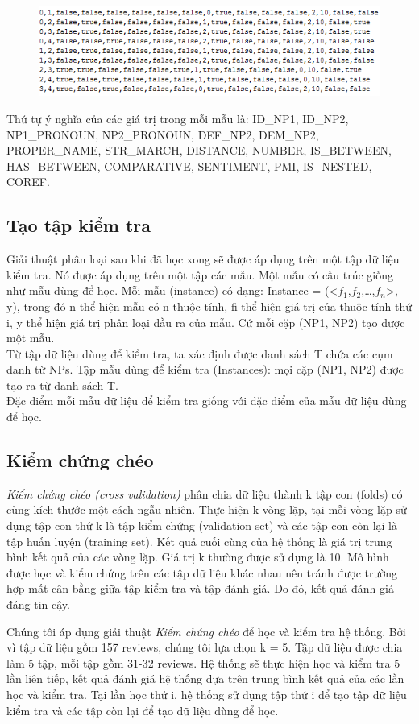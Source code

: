 \documentclass[12pt]{report}
\begin{document}
				\begin{figure}[H] 
					\centering
					\includegraphics{images/examples_train.png}
				\end{figure} 
				\par Thứ tự ý nghĩa của các giá trị trong mỗi mẫu là: ID\_NP1, ID\_NP2, NP1\_PRONOUN, NP2\_PRONOUN, DEF\_NP2, DEM\_NP2, PROPER\_NAME, STR\_MARCH, DISTANCE, NUMBER, IS\_BETWEEN, HAS\_BETWEEN, COMPARATIVE, SENTIMENT, PMI, IS\_NESTED, COREF.
			\subsection*{Tạo tập kiểm tra}
				\par Giải thuật phân loại sau khi đã học xong sẽ được áp dụng trên một tập dữ liệu kiểm tra. Nó được áp dụng trên một tập các mẫu. Một mẫu có cấu trúc giống như mẫu dùng để học. Mỗi mẫu (instance) có dạng: Instance = (<$f_1$,$f_2$,…,$f_n$>, y), trong đó n thể hiện mẫu có n thuộc tính, fi thể hiện giá trị của thuộc tính thứ i, y thể hiện giá trị phân loại đầu ra của mẫu. Cứ mỗi cặp (NP1, NP2) tạo được một mẫu. 
				\\Từ tập dữ liệu dùng để kiểm tra, ta xác định được danh sách T chứa các cụm danh từ NPs. Tập mẫu dùng để kiểm tra (Instances): mọi cặp (NP1, NP2) được tạo ra từ danh sách T.
				\\Đặc điểm mỗi mẫu dữ liệu để kiểm tra giống với đặc điểm của mẫu dữ liệu dùng để học.
			\subsection*{Kiểm chứng chéo}
				\par \textit{Kiểm chứng chéo (cross validation)} phân chia dữ liệu thành k tập con (folds) có cùng kích thước một cách ngẫu nhiên. Thực hiện k vòng lặp, tại mỗi vòng lặp sử dụng tập con thứ k là tập kiểm chứng (validation set) và các tập con còn lại là tập huấn luyện (training set). Kết quả cuối cùng của hệ thống là giá trị trung bình kết quả của các vòng lặp. Giá trị k thường được sử dụng là 10. Mô hình được học và kiểm chứng trên các tập dữ liệu khác nhau nên tránh được trường hợp mất cân bằng giữa tập kiểm tra và tập đánh giá. Do đó, kết quả đánh giá đáng tin cậy.
				\par Chúng tôi áp dụng giải thuật \textit{Kiểm chứng chéo} để học và kiểm tra hệ thống. Bởi vì tập dữ liệu gồm 157 reviews, chúng tôi lựa chọn k = 5. Tập dữ liệu được chia làm 5 tập, mỗi tập gồm 31-32 reviews. Hệ thống sẽ thực hiện học và kiểm tra 5 lần liên tiếp, kết quả đánh giá hệ thống dựa trên trung bình kết quả của các lần học và kiểm tra. Tại lần học thứ i, hệ thống sử dụng tập thứ i để tạo tập dữ liệu kiểm tra và các tập còn lại để tạo dữ liệu dùng để học.
			
\end{document}
